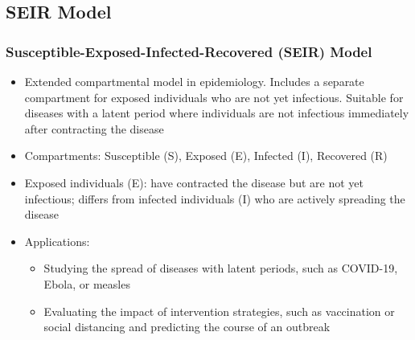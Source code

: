 \subsection{SEIR Model}

\begin{frame}
  \frametitle{Susceptible-Exposed-Infected-Recovered (SEIR) Model}
  \begin{itemize}
    \item Extended compartmental model in epidemiology. Includes a separate compartment for exposed individuals who are not yet infectious. Suitable for diseases with a latent period where individuals are not infectious immediately after contracting the disease
        
    \item Compartments: Susceptible (S), Exposed (E), Infected (I), Recovered (R)
    \item Exposed individuals (E): have contracted the disease but are not yet infectious; differs from infected individuals (I) who are actively spreading the disease
    \item Applications:
      \begin{itemize}
        \item Studying the spread of diseases with latent periods, such as COVID-19, Ebola, or measles
        \item Evaluating the impact of intervention strategies, such as vaccination or social distancing and predicting the course of an outbreak
      \end{itemize}
  \end{itemize}
\end{frame}


